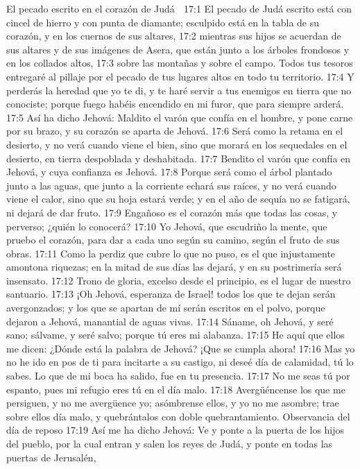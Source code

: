 El pecado escrito en el corazón de Judá  

17:1 El pecado de Judá escrito está con cincel de hierro y con punta de diamante; esculpido está en la tabla de su corazón, y en los cuernos de sus altares,  
17:2 mientras sus hijos se acuerdan de sus altares y de sus imágenes de Asera, que están junto a los árboles frondosos y en los collados altos,  
17:3 sobre las montañas y sobre el campo. Todos tus tesoros entregaré al pillaje por el pecado de tus lugares altos en todo tu territorio.  
17:4 Y perderás la heredad que yo te di, y te haré servir a tus enemigos en tierra que no conociste; porque fuego habéis encendido en mi furor, que para siempre arderá.  
17:5 Así ha dicho Jehová: Maldito el varón que confía en el hombre, y pone carne por su brazo, y su corazón se aparta de Jehová.  
17:6 Será como la retama en el desierto, y no verá cuando viene el bien, sino que morará en los sequedales en el desierto, en tierra despoblada y deshabitada.  
17:7 Bendito el varón que confía en Jehová, y cuya confianza es Jehová.  
17:8 Porque será como el árbol plantado junto a las aguas, que junto a la corriente echará sus raíces, y no verá cuando viene el calor, sino que su hoja estará verde; y en el año de sequía no se fatigará, ni dejará de dar fruto.  
17:9 Engañoso es el corazón más que todas las cosas, y perverso; ¿quién lo conocerá?  
17:10 Yo Jehová, que escudriño la mente, que pruebo el corazón, para dar a cada uno según su camino, según el fruto de sus obras.  
17:11 Como la perdiz que cubre lo que no puso, es el que injustamente amontona riquezas; en la mitad de sus días las dejará, y en su postrimería será insensato.  
17:12 Trono de gloria, excelso desde el principio, es el lugar de nuestro santuario.  
17:13 ¡Oh Jehová, esperanza de Israel! todos los que te dejan serán avergonzados; y los que se apartan de mí serán escritos en el polvo, porque dejaron a Jehová, manantial de aguas vivas.  
17:14 Sáname, oh Jehová, y seré sano; sálvame, y seré salvo; porque tú eres mi alabanza.  
17:15 He aquí que ellos me dicen: ¿Dónde está la palabra de Jehová? ¡Que se cumpla ahora!  
17:16 Mas yo no he ido en pos de ti para incitarte a su castigo, ni deseé día de calamidad, tú lo sabes. Lo que de mi boca ha salido, fue en tu presencia.  
17:17 No me seas tú por espanto, pues mi refugio eres tú en el día malo.  
17:18 Avergüéncense los que me persiguen, y no me avergüence yo; asómbrense ellos, y yo no me asombre; trae sobre ellos día malo, y quebrántalos con doble quebrantamiento.  
Observancia del día de reposo  
17:19 Así me ha dicho Jehová: Ve y ponte a la puerta de los hijos del pueblo, por la cual entran y salen los reyes de Judá, y ponte en todas las puertas de Jerusalén,  
